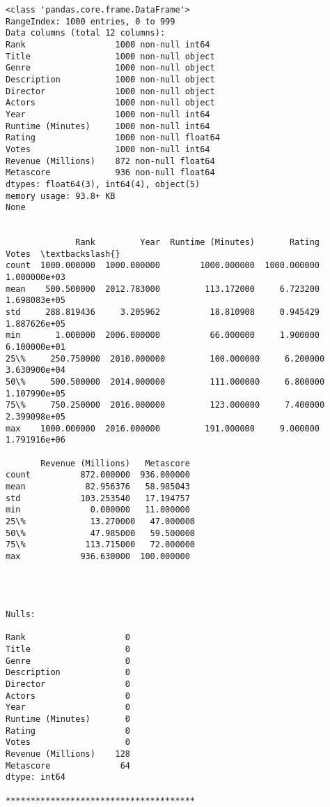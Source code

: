 \documentclass[11pt]{article}
\begin{document}
    \begin{Verbatim}[commandchars=\\\{\}]
<class 'pandas.core.frame.DataFrame'>
RangeIndex: 1000 entries, 0 to 999
Data columns (total 12 columns):
Rank                  1000 non-null int64
Title                 1000 non-null object
Genre                 1000 non-null object
Description           1000 non-null object
Director              1000 non-null object
Actors                1000 non-null object
Year                  1000 non-null int64
Runtime (Minutes)     1000 non-null int64
Rating                1000 non-null float64
Votes                 1000 non-null int64
Revenue (Millions)    872 non-null float64
Metascore             936 non-null float64
dtypes: float64(3), int64(4), object(5)
memory usage: 93.8+ KB
None 


              Rank         Year  Runtime (Minutes)       Rating         Votes  \textbackslash{}
count  1000.000000  1000.000000        1000.000000  1000.000000  1.000000e+03   
mean    500.500000  2012.783000         113.172000     6.723200  1.698083e+05   
std     288.819436     3.205962          18.810908     0.945429  1.887626e+05   
min       1.000000  2006.000000          66.000000     1.900000  6.100000e+01   
25\%     250.750000  2010.000000         100.000000     6.200000  3.630900e+04   
50\%     500.500000  2014.000000         111.000000     6.800000  1.107990e+05   
75\%     750.250000  2016.000000         123.000000     7.400000  2.399098e+05   
max    1000.000000  2016.000000         191.000000     9.000000  1.791916e+06   

       Revenue (Millions)   Metascore  
count          872.000000  936.000000  
mean            82.956376   58.985043  
std            103.253540   17.194757  
min              0.000000   11.000000  
25\%             13.270000   47.000000  
50\%             47.985000   59.500000  
75\%            113.715000   72.000000  
max            936.630000  100.000000   




Nulls:

Rank                    0
Title                   0
Genre                   0
Description             0
Director                0
Actors                  0
Year                    0
Runtime (Minutes)       0
Rating                  0
Votes                   0
Revenue (Millions)    128
Metascore              64
dtype: int64

**************************************



    \end{Verbatim}
\end{document}
